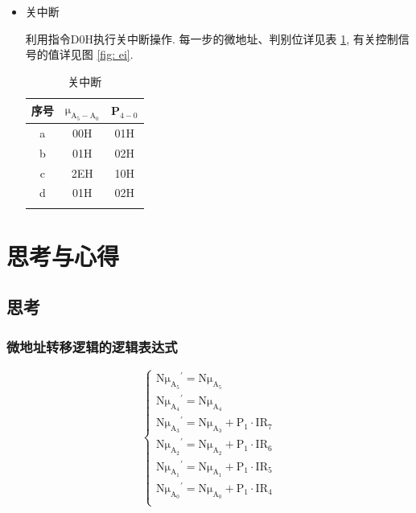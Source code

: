 \documentclass[../main.tex]{subfiles}
\begin{document}
\begin{enumerate}
\begin{itemize}
              \item 关中断

                    利用指令D0H执行关中断操作.
                    每一步的微地址、判别位详见表 \ref{tab: ei}, 有关控制信号的值详见图 \ref{fig: ei}.

                    \begin{table}[p]
                        \centering
                        \begin{tabular}{ccc}
                            \Xhline{1pt}
                            序号 & $\mathrm{\mu_{A_{5}-A_{0}}}$ & P$_{4-0}$ \\ \hline
                            a  & 00H                          & 01H       \\
                            b  & 01H                          & 02H       \\
                            c  & 2EH                          & 10H       \\
                            d  & 01H                          & 02H       \\ \Xhline{1pt}
                        \end{tabular}
                        \caption{关中断}
                        \label{tab: ei}
                    \end{table}

          \end{itemize}

\end{enumerate}

\section{思考与心得}

\subsection{思考}

\subsubsection{微地址转移逻辑的逻辑表达式}

\begin{equation}
    \begin{cases}
        \mathrm{N{\mu_{A_5}}^{\prime} = N\mu_{A_5}} \\
        \mathrm{N{\mu_{A_4}}^{\prime} = N\mu_{A_4}} \\
        \mathrm{N{\mu_{A_3}}^{\prime} = N\mu_{A_3} + P_1 \cdot IR_7} \\
        \mathrm{N{\mu_{A_2}}^{\prime} = N\mu_{A_2} + P_1 \cdot IR_6} \\
        \mathrm{N{\mu_{A_1}}^{\prime} = N\mu_{A_1} + P_1 \cdot IR_5} \\
        \mathrm{N{\mu_{A_0}}^{\prime} = N\mu_{A_0} + P_1 \cdot IR_4} \\
    \end{cases}
\end{equation}
\end{document}
